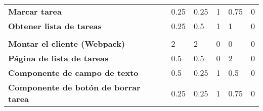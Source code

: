 \begin{table}[]
\begin{adjustbox}{width=\columnwidth,center}
\begin{tabular}{llllll}
{\color[HTML]{000000} \textbf{Marcar tarea}}                           & {\color[HTML]{000000} 0.25}                     & {\color[HTML]{000000} 0.25}                     & {\color[HTML]{000000} 1}                            & {\color[HTML]{000000} 0.75}                                 & {\color[HTML]{000000} 0}                                        \\
{\color[HTML]{000000} \textbf{Obtener lista de tareas}}                & {\color[HTML]{000000} 0.25}                     & {\color[HTML]{000000} 0.5}                      & {\color[HTML]{000000} 1}                            & {\color[HTML]{000000} 1}                                    & {\color[HTML]{000000} 0}                                        \\
{\color[HTML]{000000} }                                                & {\color[HTML]{000000} }                         & {\color[HTML]{000000} }                         & {\color[HTML]{000000} }                             & {\color[HTML]{000000} }                                     & {\color[HTML]{000000} }                                         \\
{\color[HTML]{000000} \textbf{Montar el cliente (Webpack)}}            & {\color[HTML]{000000} 2}                        & {\color[HTML]{000000} 2}                        & {\color[HTML]{000000} 0}                            & {\color[HTML]{000000} 0}                                    & {\color[HTML]{000000} 0}                                        \\
{\color[HTML]{000000} \textbf{Página de lista de tareas}}              & {\color[HTML]{000000} 0.5}                      & {\color[HTML]{000000} 0.5}                      & {\color[HTML]{000000} 0}                            & {\color[HTML]{000000} 2}                                    & {\color[HTML]{000000} 0}                                        \\
{\color[HTML]{000000} \textbf{Componente de campo de texto}}           & {\color[HTML]{000000} 0.5}                      & {\color[HTML]{000000} 0.25}                     & {\color[HTML]{000000} 1}                            & {\color[HTML]{000000} 0.5}                                  & {\color[HTML]{000000} 0}                                        \\
{\color[HTML]{000000} \textbf{Componente de botón de borrar tarea}}    & {\color[HTML]{000000} 0.25}                     & {\color[HTML]{000000} 0.25}                     & {\color[HTML]{000000} 1}                            & {\color[HTML]{000000} 0.75}                                 & {\color[HTML]{000000} 0}                                        \\

\end{tabular}
\end{adjustbox}
\end{table}
